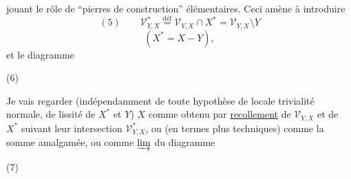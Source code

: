 
jouant le rôle de ``pierres de construction'' élémentaires. Ceci amène à introduire
\[
(5)\qquad \mathcal V_{Y,X}^*\overset{\mathrm{déf}}=\mathcal V_{Y,X}\cap X^*=\mathcal V_{Y,X}\setminus Y
\]
\[
(X^*=X-Y),
\]
et le diagramme 

(6)

Je vais regarder (indépendamment de toute hypothèse \unsure{$=$|--} de locale trivialité normale,  de lissité de $X^*$ et $Y$) $X$ comme obtenu par \uline{recollement} de $\mathcal V_{Y,X}$ et de $X^*$ suivant leur intersection $\mathcal V_{Y,X}^*$, ou (en termes plus techniques) comme la somme amalgamée, ou comme   $\varinjlim$ du diagramme

(7)


